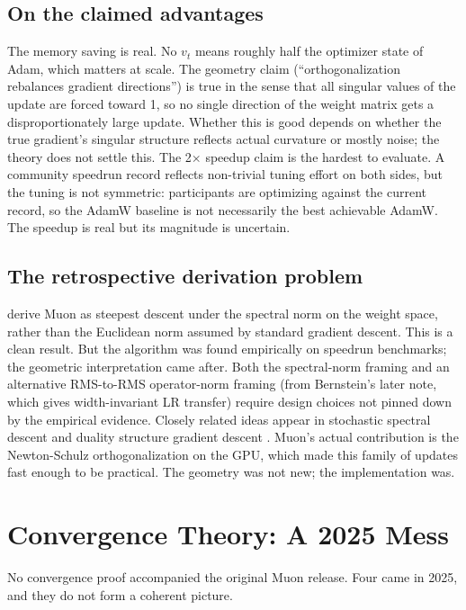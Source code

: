 \documentclass[11pt]{article}
\begin{document}
\subsection{On the claimed advantages}
The memory saving is real. No $v_t$ means roughly half the optimizer state of Adam, which matters at scale. The geometry claim (``orthogonalization rebalances gradient directions'') is true in the sense that all singular values of the update are forced toward 1, so no single direction of the weight matrix gets a disproportionately large update. Whether this is good depends on whether the true gradient's singular structure reflects actual curvature or mostly noise; the theory does not settle this. The 2$\times$ speedup claim is the hardest to evaluate. A community speedrun record reflects non-trivial tuning effort on both sides, but the tuning is not symmetric: participants are optimizing against the current record, so the AdamW baseline is not necessarily the best achievable AdamW. The speedup is real but its magnitude is uncertain.

\subsection{The retrospective derivation problem}
\citet{bernstein2024modular} derive Muon as steepest descent under the spectral norm on the weight space, rather than the Euclidean norm assumed by standard gradient descent. This is a clean result. But the algorithm was found empirically on speedrun benchmarks; the geometric interpretation came after. Both the spectral-norm framing and an alternative RMS-to-RMS operator-norm framing (from Bernstein's later note, which gives width-invariant LR transfer) require design choices not pinned down by the empirical evidence. Closely related ideas appear in stochastic spectral descent \citep{carlson2015stochastic} and duality structure gradient descent \citep{flynn2017duality}. Muon's actual contribution is the Newton-Schulz orthogonalization on the GPU, which made this family of updates fast enough to be practical. The geometry was not new; the implementation was.

\section{Convergence Theory: A 2025 Mess}
\label{sec:theory}

No convergence proof accompanied the original Muon release. Four came in 2025, and they do not form a coherent picture.
\end{document}
